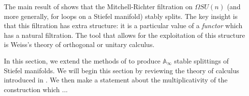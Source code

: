 The main result of \cite{Arone} shows that the Mitchell-Richter filtration on $\Omega SU(n)$ (and more generally, for loops on a Stiefel manifold) stably splits.  The key insight is that this filtration has extra structure: it is a particular value of a \emph{functor} which has a natural filtration.  The tool that allows for the exploitation of this structure is Weiss's theory of orthogonal or unitary calculus.  

In this section, we extend the methods of \cite{Arone} to produce $\mathbb{A}_\infty$ stable splittings of Stiefel manifolds.  We will begin this section by reviewing the theory of calculus introduced in \cite{Weiss}.  We then make a statement about the multiplicativity of the construction which ...%